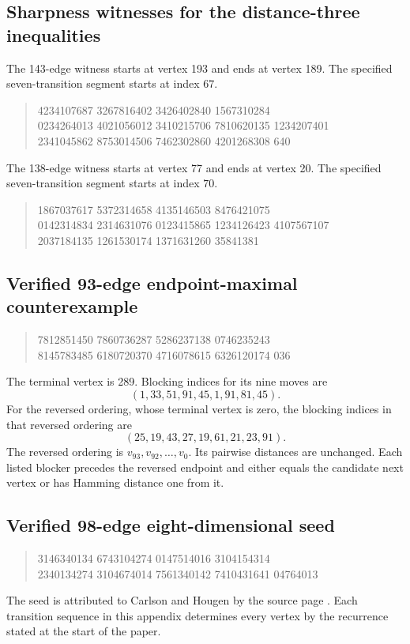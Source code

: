 \documentclass[11pt,a4paper]{article}
\theoremstyle{definition}
\theoremstyle{remark}
\begin{document}
\subsection{Sharpness witnesses for the distance-three inequalities}\label{app:pair-sharpness}
The 143-edge witness starts at vertex 193 and ends at vertex 189. The specified seven-transition segment starts at index $67$.
\begin{quote}\small{} 4234107687 3267816402 3426402840 1567310284\\
0234264013 4021056012 3410215706 7810620135 1234207401\\
2341045862 8753014506 7462302860 4201268308 640
\end{quote}
The 138-edge witness starts at vertex 77 and ends at vertex 20. The specified seven-transition segment starts at index $70$.
\begin{quote}\small{} 1867037617 5372314658 4135146503 8476421075\\
0142314834 2314631076 0123415865 1234126423 4107567107\\
2037184135 1261530174 1371631260 35841381
\end{quote}

\subsection{Verified 93-edge endpoint-maximal counterexample}
\begin{quote}\small{} 7812851450 7860736287 5286237138 0746235243\\
8145783485 6180720370 4716078615 6326120174 036
\end{quote}
The terminal vertex is 289. Blocking indices for its nine moves are
\[
(1,33,51,91,45,1,91,81,45).
\]
For the reversed ordering, whose terminal vertex is zero, the blocking indices in that reversed ordering are
\[
(25,19,43,27,19,61,21,23,91).
\]
The reversed ordering is $v_{93},v_{92},\ldots,v_0$. Its pairwise distances are unchanged. Each listed blocker precedes the reversed endpoint and either equals the candidate next vertex or has Hamming distance one from it.

\subsection{Verified 98-edge eight-dimensional seed}
\begin{quote}\small{} 3146340134 6743104274 0147514016 3104154314\\
2340134274 3104674014 7561340142 7410431641 04764013
\end{quote}
The seed is attributed to Carlson and Hougen by the source page \cite{records}. Each transition sequence in this appendix determines every vertex by the recurrence stated at the start of the paper.
\end{document}
